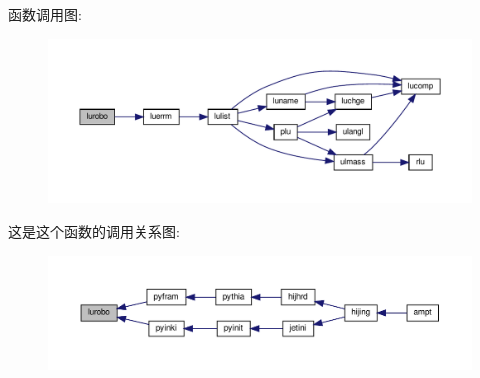 函数调用图\+:
\nopagebreak
\begin{figure}[H]
\begin{center}
\leavevmode
\includegraphics[width=350pt]{lurobo_8f90_a2811f0ff6cdc29a91ae856f5ec644bb5_cgraph}
\end{center}
\end{figure}
这是这个函数的调用关系图\+:
\nopagebreak
\begin{figure}[H]
\begin{center}
\leavevmode
\includegraphics[width=350pt]{lurobo_8f90_a2811f0ff6cdc29a91ae856f5ec644bb5_icgraph}
\end{center}
\end{figure}
